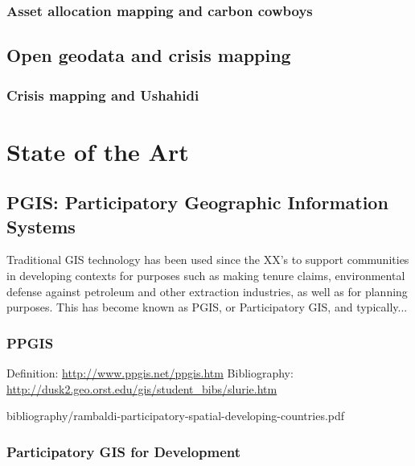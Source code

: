\documentclass[11pt]{report}
\begin{document}
\subsection{Asset allocation mapping and carbon cowboys}


\section{Open geodata and crisis mapping}
\subsection{Crisis mapping and Ushahidi}

\chapter{State of the Art}
\section{PGIS: Participatory Geographic Information Systems}

Traditional GIS technology has been used since the XX's to support communities in developing contexts for purposes such as making tenure claims, environmental defense against petroleum and other extraction industries, as well as for planning purposes. This has become known as PGIS, or Participatory GIS, and typically... 


\subsection{PPGIS}

Definition: \url{http://www.ppgis.net/ppgis.htm}
Bibliography: \url{http://dusk2.geo.orst.edu/gis/student_bibs/slurie.htm}


bibliography/rambaldi-participatory-spatial-developing-countries.pdf

\subsection{Participatory GIS for Development}
\end{document}
